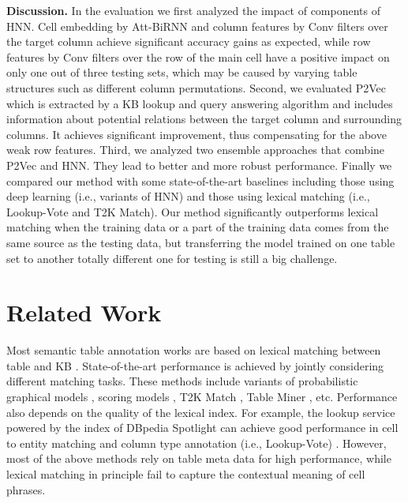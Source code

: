 \documentclass{article}
\begin{document}
\noindent \textbf{Discussion.}
In the evaluation we first analyzed the impact of components of HNN.
Cell embedding by Att-BiRNN and column features by 
Conv filters over the target column 
achieve significant accuracy gains as expected, 
while row features by Conv filters over the row of the main cell 
have a positive impact on only one out of three testing sets,
which may be caused by varying table structures such as different column permutations.
Second, we evaluated P2Vec which is extracted by a KB lookup and query answering algorithm and includes information about potential relations between the target column and surrounding columns.
It achieves significant improvement, thus compensating for the above weak row features.
Third, we analyzed two ensemble approaches that combine P2Vec and HNN. 
They lead to better and more robust performance.
Finally we compared our method with some state-of-the-art baselines including those using deep learning (i.e., variants of HNN) and those using lexical matching (i.e., Lookup-Vote and T2K Match).
Our method 
significantly outperforms lexical matching
when the training data or a part of the training data comes from the same source as the testing data, but transferring the model trained on one table set to another totally different one for testing is still a big challenge.

\section{Related Work}\label{sec:related_work}
Most semantic table annotation works are based on lexical matching between table and KB \cite{venetis2011recovering,pham2016semantic,cafarella2018ten}.
State-of-the-art performance is achieved by jointly considering different matching tasks.
These methods include variants of probabilistic graphical models \cite{limaye2010annotating,mulwad2013semantic,bhagavatula2015tabel},
scoring models \cite{chu2015katara},
T2K Match \cite{ritze2015matching}, Table Miner \cite{zhang2017effective}, etc.
Performance also depends on the quality of the lexical index.
For example, the lookup service powered by the index of DBpedia Spotlight \cite{mendes2011dbpedia} 
can achieve good performance in cell to entity matching and column type annotation (i.e., Lookup-Vote) \cite{chen2019colnet}.
However, most of the above methods rely on table meta data for high performance, 
while lexical matching in principle fail to capture the contextual meaning of cell phrases.
\end{document}
